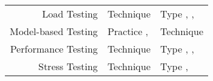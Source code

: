 \begin{paperTable}
\begin{minipage}{\linewidth}
\begin{tabular}{|r|l|l|}
            Load Testing             & Technique \cite[p.~38]{IEEE2021b}                                   & Type \cite[p.~253]{IEEE2017}, \cite[pp.~5, 20, 22]{IEEE2022}, \cite{ISTQB}                                                                 \\
            Model-based Testing      & Practice \cite[p.~22]{IEEE2022}, \cite[p.~viii]{IEEE2021b}          & Technique \cite[p.~4]{Kam2008}                                                                                                             \\
            Performance Testing      & Technique \cite[p.~38]{IEEE2021b}                                   & Type \cite[pp.~7, 22, 26\==27]{IEEE2022}, \cite[p.~7]{IEEE2021b}, \cite[p.~2]{IEEE2021a}                                                   \\
            Stress Testing           & Technique \cite[p.~38]{IEEE2021b}                                   & Type \cite[p.~442]{IEEE2017}, \cite[pp.~9, 22]{IEEE2022}                                                                                   \\
            \hline
        \end{tabular}
    \end{minipage}
\end{paperTable}
